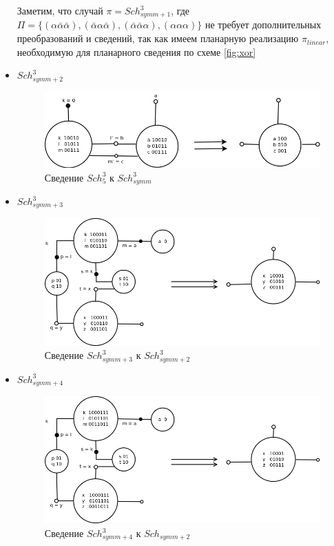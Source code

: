 \documentclass[12pt]{article}
\begin{document}
\begin{itemize}
Заметим, что случай $\pi=Sch_{symm+1}^3$, где 
$\Pi = \{ (\alpha\bar{\alpha}\bar{\alpha}), (\bar{\alpha}\alpha\bar{\alpha}), (\bar{\alpha}\bar{\alpha}\alpha), (\alpha\alpha\alpha)\}$ 
не требует дополнительных преобразований и сведений, так как имеем планарную реализацию
$\pi_{linear}$, необходимую для планарного сведения по схеме \ref{fig:xor}
\item{$Sch_{symm+2}^3$}
\begin{figure}[htb]
\centering
\includegraphics[width=1.0\textwidth]{3_2to3.png}
\caption{Сведение $Sch_5^3$ к $Sch_{symm}^3$ }
\label{fig:3_2to3}
\end{figure}
\item{$Sch_{symm+3}^3$}
\begin{figure}[htb]
\centering
\includegraphics[width=1.0\textwidth]{3_3to3_2.png}
\caption{Сведение $Sch_{symm+3}^3$ к $Sch_{symm+2}^3$}
\label{fig:3_3to3_2}
\end{figure}
\item{$Sch_{symm+4}^3$}
\begin{figure}[htb]
\centering
\includegraphics[width=1.0\textwidth]{3_4to3_2.png}
\caption{Сведение $Sch_{symm+4}^3$ к $Sch_{symm+2}$}
\label{fig:3_4to3_2}
\end{figure}
\end{itemize}
\end{document}
